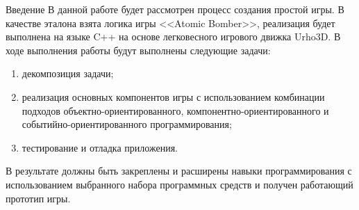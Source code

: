 



	

	\tableofcontents

	\begin{anonsection}{Введение}
		В данной работе будет рассмотрен процесс создания простой игры.
		В качестве эталона взята логика игры <<Atomic Bomber>>, реализация будет выполнена на языке C++ на основе легковесного игрового движка Urho3D.
		В ходе выполнения работы будут выполнены следующие задачи:
		\begin{enumerate}
			\item декомпозиция задачи;
			\item реализация основных компонентов игры с использованием комбинации подходов объектно-ориентированного, компонентно-ориентированного и событийно-ориентированного программирования;
			\item тестирование и отладка приложения.
		\end{enumerate}

		В результате должны быть закреплены и расширены навыки программирования с использованием выбранного набора программных средств и получен работающий прототип игры.

	\end{anonsection}

